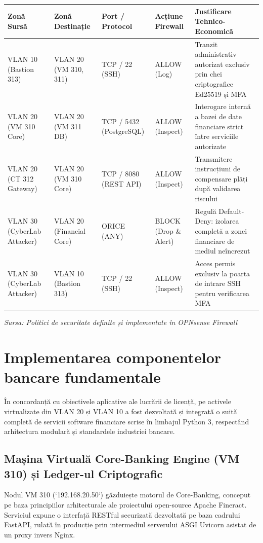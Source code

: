 \begin{table}[htbp]
\centering
\small
\begin{tabular}{p{} p{} p{} p{} p{}}
\toprule
Zonă Sursă & Zonă Destinație & Port / Protocol & Acțiune Firewall & Justificare Tehnico-Economică \\
\midrule
VLAN 10 (Bastion 313) & VLAN 20 (VM 310, 311) & TCP / 22 (SSH) & ALLOW (Log) & Tranzit administrativ autorizat exclusiv prin chei criptografice Ed25519 și MFA \\
VLAN 20 (VM 310 Core) & VLAN 20 (VM 311 DB) & TCP / 5432 (PostgreSQL) & ALLOW (Inspect) & Interogare internă a bazei de date financiare strict între serviciile autorizate \\
VLAN 20 (CT 312 Gateway) & VLAN 20 (VM 310 Core) & TCP / 8080 (REST API) & ALLOW (Inspect) & Transmitere instrucțiuni de compensare plăți după validarea riscului \\
VLAN 30 (CyberLab Attacker) & VLAN 20 (Financial Core) & ORICE (ANY) & BLOCK (Drop \& Alert) & Regulă Default-Deny: izolarea completă a zonei financiare de mediul neîncrezut \\
VLAN 30 (CyberLab Attacker) & VLAN 10 (Bastion 313) & TCP / 22 (SSH) & ALLOW (Inspect) & Acces permis exclusiv la poarta de intrare SSH pentru verificarea MFA \\
\bottomrule
\end{tabular}
\end{table}

\textit{Sursa: Politici de securitate definite și implementate în OPNsense Firewall}

\section{Implementarea componentelor bancare fundamentale}

În concordanță cu obiectivele aplicative ale lucrării de licență, pe activele virtualizate din VLAN 20 și VLAN 10 a fost dezvoltată și integrată o suită completă de servicii software financiare scrise în limbajul Python 3, respectând arhitectura modulară și standardele industriei bancare.

\subsection{Mașina Virtuală Core-Banking Engine (VM 310) și Ledger-ul Criptografic}

Nodul VM 310 (`192.168.20.50`) găzduiește motorul de Core-Banking, conceput pe baza principiilor arhitecturale ale proiectului open-source Apache Fineract. Serviciul expune o interfață RESTful securizată dezvoltată pe baza cadrului FastAPI, rulată în producție prin intermediul serverului ASGI Uvicorn asistat de un proxy invers Nginx.

